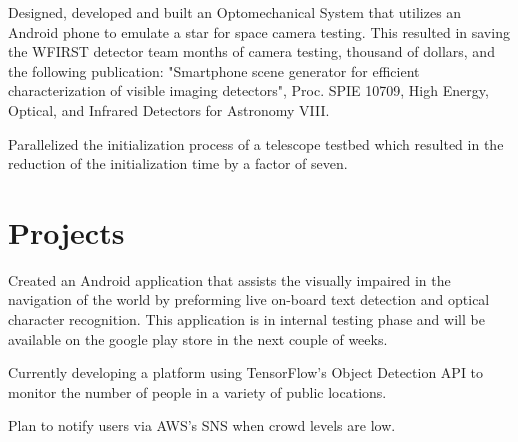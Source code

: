 \documentclass[letterpaper]{deedy-resume} %
\begin{document}
\begin{minipage}[t]{0.66\textwidth}
\sectionspace %


\begin{tightitemize}
	\item 	Designed, developed and built an Optomechanical System that utilizes an Android phone to emulate a star for space camera testing. This resulted in saving the WFIRST detector team months of camera testing, thousand of dollars, and the following publication: "Smartphone scene generator for efficient characterization of visible imaging detectors", Proc. SPIE 10709, High Energy, Optical, and Infrared Detectors for Astronomy VIII.
	
	\item Parallelized the initialization process of a telescope testbed which resulted in the reduction of the initialization time by a factor of seven.   
	
\end{tightitemize}
\sectionspace %


\section{Projects}

\begin{tightitemize}
	\item Created an Android application that assists the visually impaired in the navigation of the world by preforming live on-board text detection and optical character recognition. This application is in internal testing phase and will be available on the google play store in the next couple of weeks.  
\end{tightitemize}

\sectionspace %
\begin{tightitemize}
	\item Currently developing a  platform using TensorFlow's Object Detection API to monitor the number of people in a variety of public locations. 
	\item Plan to notify users via AWS's SNS when crowd levels are low. 
\end{tightitemize}


\end{minipage}
\end{document}
